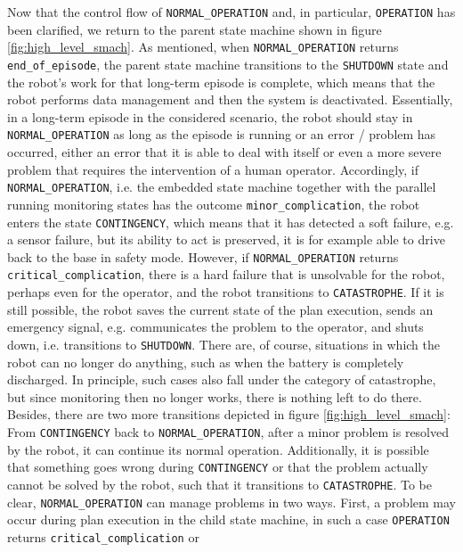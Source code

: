 \documentclass[english, master, utf8]{base/thesis_KBS}
\newcommand{\code}[1]{\colorbox{light-gray}{\texttt{#1}}}
\begin{document}
\noindent
Now that the control flow of \code{NORMAL\_OPERATION} and, in particular, \code{OPERATION} has been clarified, we return to the parent state machine shown 
in figure \ref{fig:high_level_smach}.
As mentioned, when \code{NORMAL\_OPERATION} returns \code{end\_of\_episode}, the parent state machine transitions to the \code{SHUTDOWN} state and the 
robot's work for that long-term episode is complete, which means that the robot performs data management and then the system is deactivated.
Essentially, in a long-term episode in the considered scenario, the robot should stay in \code{NORMAL\_OPERATION} as 
long as the episode is running or an error / problem has occurred, either an error that it is able to deal with itself or even a more severe problem that requires the 
intervention of a human operator. Accordingly, if \code{NORMAL\_OPERATION}, i.e. the embedded state machine together with the parallel running monitoring states has the outcome 
\code{minor\_complication}, the robot enters the state \code{CONTINGENCY}, which means that it has detected a soft failure, e.g. a sensor failure, but its ability to act
is preserved, it is for example able to drive back to the base in safety mode. However, if \code{NORMAL\_OPERATION} returns \code{critical\_complication}, there is a hard 
failure that is unsolvable for the robot, perhaps even for the operator, and the robot transitions to \code{CATASTROPHE}. If it is still possible, the robot saves the current 
state of the plan execution, sends an emergency signal, e.g. communicates the problem to the operator, and shuts down, i.e. transitions to \code{SHUTDOWN}.
There are, of course, situations in which the robot can no longer do anything, such as when the battery is completely discharged.
In principle, such cases also fall under the category of catastrophe, but since monitoring then no longer works, there is nothing left to do there.
Besides, there are two more transitions depicted in figure \ref{fig:high_level_smach}: From \code{CONTINGENCY} back to \code{NORMAL\_OPERATION}, after a minor problem is resolved by the robot, it can continue
its normal operation. Additionally, it is possible that something goes wrong during \code{CONTINGENCY} or that the problem actually cannot be solved by the robot,
such that it transitions to \code{CATASTROPHE}.\newline
To be clear, \code{NORMAL\_OPERATION} can manage problems in two ways.
First, a problem may occur during plan execution in the child state machine, in such a case \code{OPERATION} returns \code{critical\_complication} or 
\end{document}
